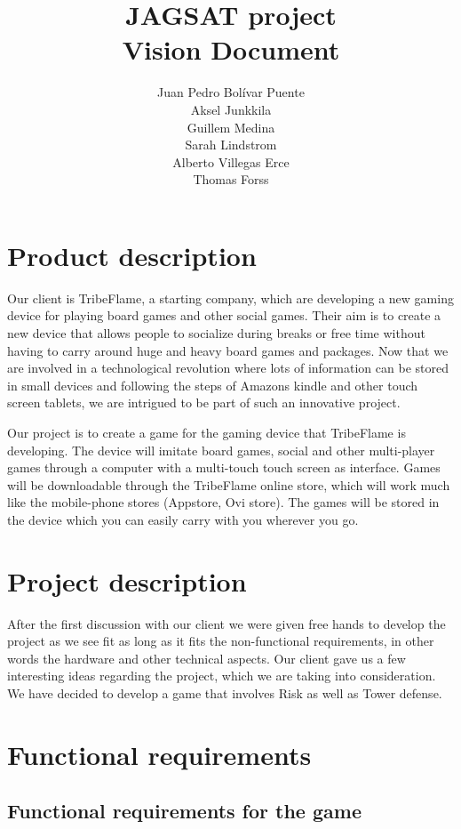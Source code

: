 \documentclass[12pt,a4paper]{article}
\title{\large JAGSAT project\\\huge Vision Document}
\author{
  Juan Pedro Bolívar Puente\\ 
  Aksel Junkkila\\
  Guillem Medina\\ 
  Sarah Lindstrom\\ 
  Alberto Villegas Erce\\ 
  Thomas Forss
}
\begin{document}
\maketitle

\tableofcontents
\pagebreak

\section{Product description}

Our client is TribeFlame, a starting company, which are developing a
new gaming device for playing board games and other social
games. Their aim is to create a new device that allows people to
socialize during breaks or free time without having to carry around
huge and heavy board games and packages. Now that we are involved in a
technological revolution where lots of information can be stored in
small devices and following the steps of Amazons kindle and other
touch screen tablets, we are intrigued to be part of such an
innovative project.

Our project is to create a game for the gaming device that TribeFlame
is developing. The device will imitate board games, social and other
multi-player games through a computer with a multi-touch touch screen
as interface. Games will be downloadable through the TribeFlame online
store, which will work much like the mobile-phone stores (Appstore,
Ovi store). The games will be stored in the device which you can
easily carry with you wherever you go.

\section{Project description}

After the first discussion with our client we were given free hands to
develop the project as we see fit as long as it fits the
non-functional requirements, in other words the hardware and other
technical aspects. Our client gave us a few interesting ideas
regarding the project, which we are taking into consideration. We have
decided to develop a game that involves Risk as well as Tower defense.

\section{Functional requirements}

\subsection{Functional requirements for the game}
\end{document}
